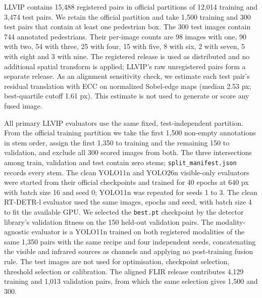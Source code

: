 \documentclass[journal]{IEEEtran}
\begin{document}
LLVIP contains 15,488 registered pairs in official partitions of 12,014 training and
3,474 test pairs. We retain the official partition and take 1,500 training and 300 test
pairs that contain at least one pedestrian box. The 300 test images contain 744 annotated
pedestrians. Their per-image counts are 98 images with one, 90 with two, 54 with three,
25 with four, 15 with five, 8 with six, 2 with seven, 5 with eight and 3 with nine. The
registered release is used as distributed and no additional spatial transform is applied;
LLVIP's raw unregistered pairs form a separate release. As an alignment sensitivity check,
we estimate each test pair's residual translation with ECC on normalized Sobel-edge maps
(median 2.53 px; best-quartile cutoff 1.61 px). This estimate is not used to generate or
score any fused image.

All primary LLVIP evaluators use the same fixed, test-independent partition. From the
official training partition we take the first 1,500 non-empty annotations in stem order,
assign the first 1,350 to training and the remaining 150 to validation, and exclude all
300 scored images from both. The three intersections among train, validation and test
contain zero stems; \texttt{split\_manifest.json} records every stem. The clean
YOLO11n and YOLO26n visible-only evaluators were started from their official checkpoints
and trained for 40 epochs at $640$ px with batch size 16 and seed 0;
YOLO11n was repeated for seeds 1 to 3. The clean RT-DETR-l evaluator used the same
images, epochs and seed, with batch size 4 to fit the available GPU. We selected the
\texttt{best.pt} checkpoint by the detector library's validation fitness on the 150
held-out validation pairs. The modality-agnostic evaluator is a YOLO11n trained on both
registered modalities of the same 1,350 pairs with the same recipe and four independent
seeds, concatenating the visible and infrared sources as channels and applying no
post-training fusion rule. The test images are not used for optimisation, checkpoint
selection, threshold selection or calibration.
The aligned FLIR release contributes 4,129 training and 1,013 validation pairs, from
which the same selection gives 1,500 and 300.
\end{document}

